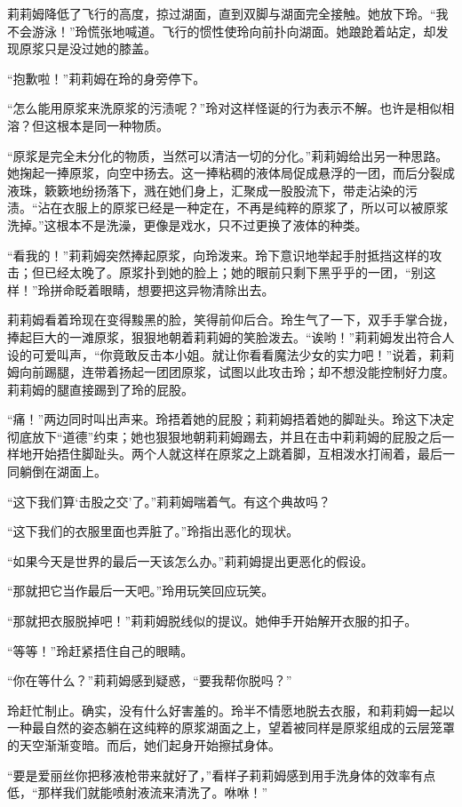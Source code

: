 莉莉姆降低了飞行的高度，掠过湖面，直到双脚与湖面完全接触。她放下玲。“我不会游泳！”玲慌张地喊道。飞行的惯性使玲向前扑向湖面。她踉跄着站定，却发现原浆只是没过她的膝盖。

“抱歉啦！”莉莉姆在玲的身旁停下。

“怎么能用原浆来洗原浆的污渍呢？”玲对这样怪诞的行为表示不解。也许是相似相溶？但这根本是同一种物质。

“原浆是完全未分化的物质，当然可以清洁一切的分化。”莉莉姆给出另一种思路。她掬起一捧原浆，向空中扬去。这一捧粘稠的液体局促成悬浮的一团，而后分裂成液珠，簌簌地纷扬落下，溅在她们身上，汇聚成一股股流下，带走沾染的污渍。“沾在衣服上的原浆已经是一种定在，不再是纯粹的原浆了，所以可以被原浆洗掉。”这根本不是洗澡，更像是戏水，只不过更换了液体的种类。

“看我的！”莉莉姆突然捧起原浆，向玲泼来。玲下意识地举起手肘抵挡这样的攻击；但已经太晚了。原浆扑到她的脸上；她的眼前只剩下黑乎乎的一团，“别这样！”玲拼命眨着眼睛，想要把这异物清除出去。

莉莉姆看着玲现在变得黢黑的脸，笑得前仰后合。玲生气了一下，双手手掌合拢，捧起巨大的一滩原浆，狠狠地朝着莉莉姆的笑脸泼去。“诶哟！”莉莉姆发出符合人设的可爱叫声，“你竟敢反击本小姐。就让你看看魔法少女的实力吧！”说着，莉莉姆向前踢腿，连带着扬起一团团原浆，试图以此攻击玲；却不想没能控制好力度。莉莉姆的腿直接踢到了玲的屁股。

“痛！”两边同时叫出声来。玲捂着她的屁股；莉莉姆捂着她的脚趾头。玲这下决定彻底放下“道德”约束；她也狠狠地朝莉莉姆踢去，并且在击中莉莉姆的屁股之后一样地开始捂住脚趾头。两个人就这样在原浆之上跳着脚，互相泼水打闹着，最后一同躺倒在湖面上。

“这下我们算‘击股之交’了。”莉莉姆喘着气。有这个典故吗？

“这下我们的衣服里面也弄脏了。”玲指出恶化的现状。

“如果今天是世界的最后一天该怎么办。”莉莉姆提出更恶化的假设。

“那就把它当作最后一天吧。”玲用玩笑回应玩笑。

“那就把衣服脱掉吧！”莉莉姆脱线似的提议。她伸手开始解开衣服的扣子。

“等等！”玲赶紧捂住自己的眼睛。

“你在等什么？”莉莉姆感到疑惑，“要我帮你脱吗？”

玲赶忙制止。确实，没有什么好害羞的。玲半不情愿地脱去衣服，和莉莉姆一起以一种最自然的姿态躺在这纯粹的原浆湖面之上，望着被同样是原浆组成的云层笼罩的天空渐渐变暗。而后，她们起身开始擦拭身体。

“要是爱丽丝你把移液枪带来就好了，”看样子莉莉姆感到用手洗身体的效率有点低，“那样我们就能喷射液流来清洗了。咻咻！”

